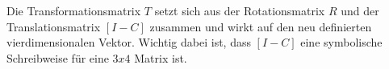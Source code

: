 Die Transformationsmatrix $T$ setzt sich aus der Rotationsmatrix $R$ und der Translationsmatrix  $[I -C]$ zusammen und wirkt auf den neu definierten vierdimensionalen Vektor. Wichtig dabei ist, dass $[I -C]$ eine symbolische Schreibweise für eine $3x4$ Matrix ist.   

 


